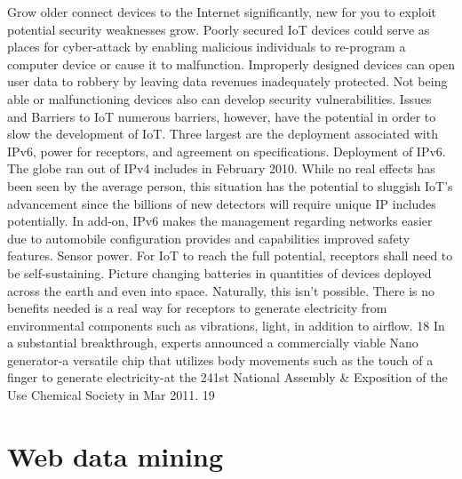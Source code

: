  	Grow older connect devices to the Internet significantly, new for you to exploit potential security weaknesses grow. Poorly secured IoT devices could serve as places for cyber-attack by enabling malicious individuals to re-program a computer device or cause it to malfunction. Improperly designed devices can open user data to robbery by leaving data revenues inadequately protected. Not being able or malfunctioning devices also can develop security vulnerabilities.
 Issues and Barriers to IoT numerous barriers, however, have the potential in order to slow the development of IoT. Three largest are the deployment associated with IPv6, power for receptors, and agreement on specifications.
Deployment of IPv6. The globe ran out of IPv4 includes in February 2010. While no real effects has been seen by the average person, this situation has the potential to sluggish IoT’s  advancement since the billions of new detectors will require unique IP includes potentially. In add-on, IPv6 makes the management regarding networks easier due to automobile configuration provides and capabilities improved safety features. Sensor power. For IoT to reach the full potential, receptors shall need to be self-sustaining. Picture changing batteries in quantities of devices deployed across the earth and even into space. Naturally, this isn’t possible. There is no benefits needed is a real way for receptors to generate electricity from environmental components such as vibrations, light, in addition to airflow. 18 In a substantial breakthrough, experts announced a commercially viable Nano generator-a versatile chip that utilizes body movements such as the touch of a finger to generate electricity-at the 241st National Assembly & Exposition of the Use Chemical Society in Mar 2011. 19

\section{Web data mining}

